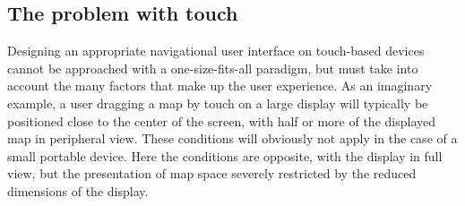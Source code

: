 \subsection{The problem with touch}

\begin{comment} ### THESIS ##################################################

The elimination of mechanical input has gained huge momentum within the domain of graphical user interfaces in recent years, largely due to the proliferation of relatively robust and innovative devices on consumer-level. As a result, a wide variety of touch-based devices now exist and a common denominator to them all is the portability and compactness that they pack by way of eliminating (or virtualizing) the traditional keyboard and mouse. Furthermore, this new generation of touch-based devices all offer one obvious feature that has become their signature and unique selling point; associating specific types of \ti{multi-touch} input with corresponding navigational actions, made possible by the application of pattern recognition\cite{Wood}. 

While the innovative features of touch input and gesture navigation are common to most of today's mobiles devices, what is not however, is their display sizes. Thus, the presentation space of these devices vary widely from that of large displays with dimensions measured in meters (e.g. interactive \ti{SMART boards}) to small smart phones with displays that measure no more than a few inches. Furthermore, they also differ in terms of processing capability, which greatly affects responsiveness, and finally, may have differing spacial orientations (e.g. the horizontally placed Microsoft Pixelsense table\fn{Previously known under the product name \ti{Surface}.}).

For these reasons, 

############################################################# 
\end{comment}  

Designing an appropriate navigational user interface on touch-based devices cannot be approached with a one-size-fits-all paradigm, but must take into account the many factors that make up the user experience. As an imaginary example, a user dragging a map by touch on a large display will typically be positioned close to the center of the screen, with half or more of the displayed map in peripheral view. These conditions will obviously not apply in the case of a small portable device. Here the conditions are opposite, with the display in full view, but the presentation of map space severely restricted by the reduced dimensions of the display. 

